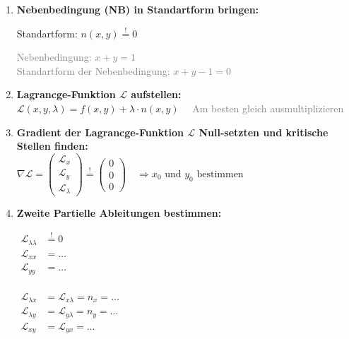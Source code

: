 \begin{enumerate}[itemsep=1ex]
    \item \textbf{Nebenbedingung (NB) in Standartform bringen:}\\
    \begin{minipage}[t]{0.4\columnwidth}
        Standartform: $n(x, y) \stackrel{!}{=} 0$
    \end{minipage}\hfill
    \begin{minipage}[t]{0.6\columnwidth}
            \textcolor{gray}{Nebenbedingung: $x + y = 1$}\\
            \textcolor{gray}{Standartform der Nebenbedingung: $x + y - 1 = 0$}
    \end{minipage}


    \item \textbf{Lagrancge-Funktion $\mathcal{L}$ aufstellen:}\\
    $\mathcal{L}(x, y, \lambda) =
    f(x, y) + \lambda \cdot n(x, y) \,\,\,\,\,\,$ \textcolor{gray}{Am besten gleich ausmultiplizieren}
    

    \item \textbf{Gradient der Lagrancge-Funktion $\mathcal{L}$ Null-setzten und kritische Stellen finden:}\\
    $\nabla \mathcal{L}=
    \begin{pmatrix}
        \mathcal{L}_x\\
        \mathcal{L}_y\\
        \mathcal{L}_\lambda
    \end{pmatrix} \stackrel{!}{=}
    \begin{pmatrix}
        0\\
        0\\
        0
    \end{pmatrix}
    \, \, \, \, \, \,
    \Rightarrow 
    x_0 \text{ und } y_0 \text{ bestimmen}$\\

    \item \textbf{Zweite Partielle Ableitungen bestimmen:}\\
    \begin{minipage}[t]{0.4\columnwidth}
        $\begin{aligned}
            \mathcal{L}_{\lambda \lambda} &\stackrel{!}{=} 0\\
            \mathcal{L}_{xx} &= \dots\\
            \mathcal{L}_{yy} &= \dots\\
        \end{aligned}$
    \end{minipage}\hfill
    \begin{minipage}[c]{0.6\columnwidth}
        $\begin{aligned}
            \mathcal{L}_{\lambda x} &= \mathcal{L}_{x\lambda} = n_x = \dots\\
            \mathcal{L}_{\lambda y} &= \mathcal{L}_{y\lambda} = n_y =\dots\\
            \mathcal{L}_{xy} &= \mathcal{L}_{yx} = \dots\\
        \end{aligned}$
    \end{minipage}



\end{enumerate}

